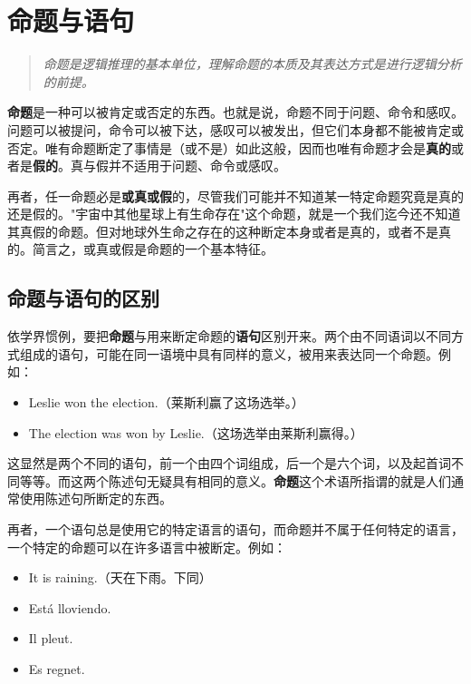 \section{命题与语句}

\begin{quotation}
\textit{命题是逻辑推理的基本单位，理解命题的本质及其表达方式是进行逻辑分析的前提。}
\end{quotation}

\textbf{命题}是一种可以被肯定或否定的东西。也就是说，命题不同于问题、命令和感叹。问题可以被提问，命令可以被下达，感叹可以被发出，但它们本身都不能被肯定或否定。唯有命题断定了事情是（或不是）如此这般，因而也唯有命题才会是\textbf{真的}或者是\textbf{假的}。真与假并不适用于问题、命令或感叹。

再者，任一命题必是\textbf{或真或假}的，尽管我们可能并不知道某一特定命题究竟是真的还是假的。"宇宙中其他星球上有生命存在"这个命题，就是一个我们迄今还不知道其真假的命题。但对地球外生命之存在的这种断定本身或者是真的，或者不是真的。简言之，或真或假是命题的一个基本特征。

\subsection{命题与语句的区别}

依学界惯例，要把\textbf{命题}与用来断定命题的\textbf{语句}区别开来。两个由不同语词以不同方式组成的语句，可能在同一语境中具有同样的意义，被用来表达同一个命题。例如：

\begin{itemize}
  \item Leslie won the election.（莱斯利赢了这场选举。）
  \item The election was won by Leslie.（这场选举由莱斯利赢得。）
\end{itemize}

这显然是两个不同的语句，前一个由四个词组成，后一个是六个词，以及起首词不同等等。而这两个陈述句无疑具有相同的意义。\textbf{命题}这个术语所指谓的就是人们通常使用陈述句所断定的东西。

再者，一个语句总是使用它的特定语言的语句，而命题并不属于任何特定的语言，一个特定的命题可以在许多语言中被断定。例如：

\begin{itemize}
  \item It is raining.（天在下雨。下同）
  \item Está lloviendo.
  \item Il pleut.
  \item Es regnet.
\end{itemize}

